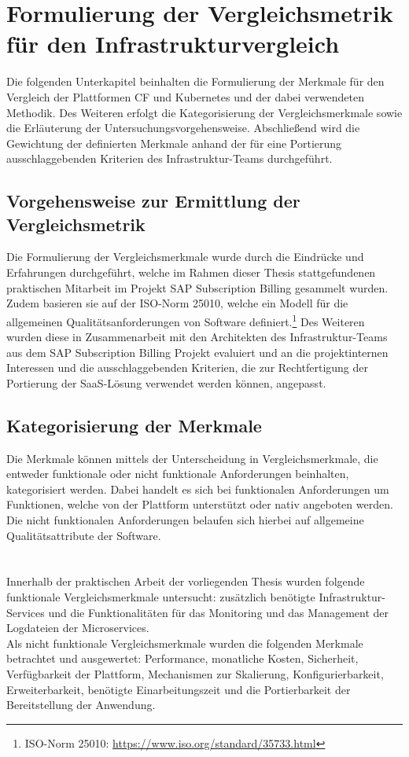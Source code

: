 \chapter{Formulierung der Vergleichsmetrik für den Infrastrukturvergleich}
\label{merkmale}
Die folgenden Unterkapitel beinhalten die Formulierung der Merkmale für den Vergleich der Plattformen \ac{CF} und Kubernetes und der dabei verwendeten Methodik. Des Weiteren erfolgt die Kategorisierung der Vergleichsmerkmale sowie die Erläuterung der Untersuchungsvorgehensweise. Abschließend wird die Gewichtung der definierten Merkmale anhand der für eine Portierung ausschlaggebenden Kriterien des Infrastruktur-Teams durchgeführt.
\section{Vorgehensweise zur Ermittlung der Vergleichsmetrik}
Die Formulierung der Vergleichsmerkmale wurde durch die Eindrücke und Erfahrungen durchgeführt, welche im Rahmen dieser Thesis stattgefundenen praktischen Mitarbeit im Projekt SAP Subscription Billing gesammelt wurden. Zudem basieren sie auf der \ac{ISO}-Norm 25010, welche ein Modell für die allgemeinen Qualitätsanforderungen von Software definiert.\footnote{\ac{ISO}-Norm 25010: \url{https://www.iso.org/standard/35733.html}}
Des Weiteren wurden diese in Zusammenarbeit mit den Architekten des Infrastruktur-Teams aus dem SAP Subscription Billing Projekt evaluiert und an die projektinternen Interessen und die ausschlaggebenden Kriterien, die zur Rechtfertigung der Portierung der \ac{SaaS}-Lösung verwendet werden können, angepasst.
\section{Kategorisierung der Merkmale}
Die Merkmale können mittels der Unterscheidung in Vergleichsmerkmale, die entweder funktionale oder nicht funktionale Anforderungen beinhalten, kategorisiert werden. Dabei handelt es sich bei funktionalen Anforderungen um Funktionen, welche von der Plattform unterstützt oder nativ angeboten werden. Die nicht funktionalen Anforderungen belaufen sich hierbei auf allgemeine Qualitätsattribute der Software.\\
\\\\
Innerhalb der praktischen Arbeit der vorliegenden Thesis wurden folgende funktionale Vergleichsmerkmale untersucht: zusätzlich benötigte Infrastruktur-Services und die Funktionalitäten für das Monitoring und das Management der Logdateien der Microservices.\\
Als nicht funktionale Vergleichsmerkmale wurden die folgenden Merkmale betrachtet und ausgewertet: Performance, monatliche Kosten, Sicherheit, Verfügbarkeit der Plattform, Mechanismen zur Skalierung, Konfigurierbarkeit, Erweiterbarkeit, benötigte Einarbeitungszeit und die Portierbarkeit der Bereitstellung der Anwendung.

